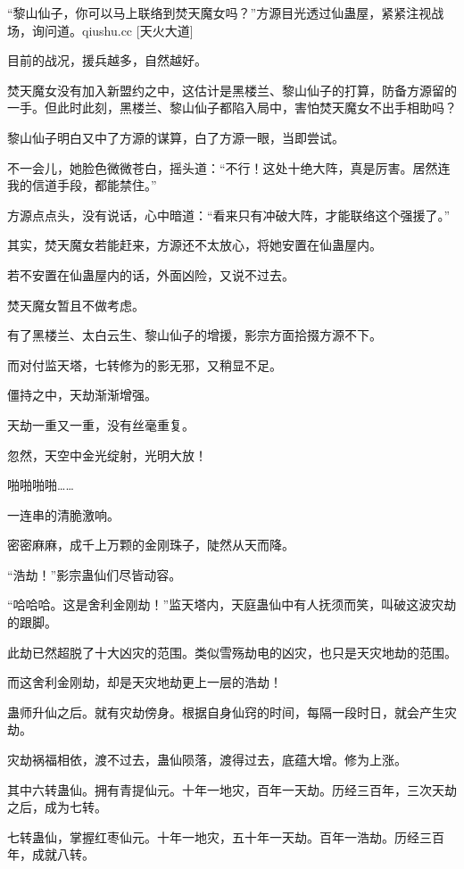 
\begin{this_body}

“黎山仙子，你可以马上联络到焚天魔女吗？”方源目光透过仙蛊屋，紧紧注视战场，询问道。qiushu.cc [天火大道]

目前的战况，援兵越多，自然越好。

焚天魔女没有加入新盟约之中，这估计是黑楼兰、黎山仙子的打算，防备方源留的一手。但此时此刻，黑楼兰、黎山仙子都陷入局中，害怕焚天魔女不出手相助吗？

黎山仙子明白又中了方源的谋算，白了方源一眼，当即尝试。

不一会儿，她脸色微微苍白，摇头道：“不行！这处十绝大阵，真是厉害。居然连我的信道手段，都能禁住。”

方源点点头，没有说话，心中暗道：“看来只有冲破大阵，才能联络这个强援了。”

其实，焚天魔女若能赶来，方源还不太放心，将她安置在仙蛊屋内。

若不安置在仙蛊屋内的话，外面凶险，又说不过去。

焚天魔女暂且不做考虑。

有了黑楼兰、太白云生、黎山仙子的增援，影宗方面拾掇方源不下。

而对付监天塔，七转修为的影无邪，又稍显不足。

僵持之中，天劫渐渐增强。

天劫一重又一重，没有丝毫重复。

忽然，天空中金光绽射，光明大放！

啪啪啪啪……

一连串的清脆激响。

密密麻麻，成千上万颗的金刚珠子，陡然从天而降。

“浩劫！”影宗蛊仙们尽皆动容。

“哈哈哈。这是舍利金刚劫！”监天塔内，天庭蛊仙中有人抚须而笑，叫破这波灾劫的跟脚。

此劫已然超脱了十大凶灾的范围。类似雪殇劫电的凶灾，也只是天灾地劫的范围。

而这舍利金刚劫，却是天灾地劫更上一层的浩劫！

蛊师升仙之后。就有灾劫傍身。根据自身仙窍的时间，每隔一段时日，就会产生灾劫。

灾劫祸福相依，渡不过去，蛊仙陨落，渡得过去，底蕴大增。修为上涨。

其中六转蛊仙。拥有青提仙元。十年一地灾，百年一天劫。历经三百年，三次天劫之后，成为七转。

七转蛊仙，掌握红枣仙元。十年一地灾，五十年一天劫。百年一浩劫。历经三百年，成就八转。


\end{this_body}
